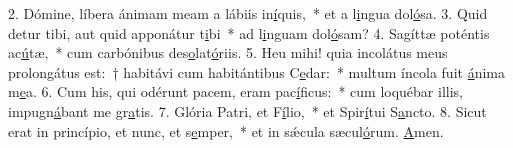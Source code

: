 2. Dómine, líbera ánimam meam a lábiis in\uline{í}quis,~* et a l\uline{i}ngua dol\uline{ó}sa.
3. Quid detur tibi, aut quid apponátur t\uline{i}bi~* ad l\uline{i}nguam dol\uline{ó}sam?
4. Sagíttæ poténtis ac\uline{ú}tæ,~* cum carbónibus des\uline{o}lat\uline{ó}riis.
5. Heu mihi! quia incolátus meus prolongátus est:~† habitávi cum habitántibus C\uline{e}dar:~* multum íncola fuit \uline{á}nima m\uline{e}a.
6. Cum his, qui odérunt pacem, eram pac\uline{í}ficus:~* cum loquébar illis, impugn\uline{á}bant me gr\uline{a}tis.
7. Glória Patri, et F\uline{í}lio,~* et Spir\uline{í}tui S\uline{a}ncto.
8. Sicut erat in princípio, et nunc, et s\uline{e}mper,~* et in sǽcula sæcul\uline{ó}rum. \uline{A}men.
